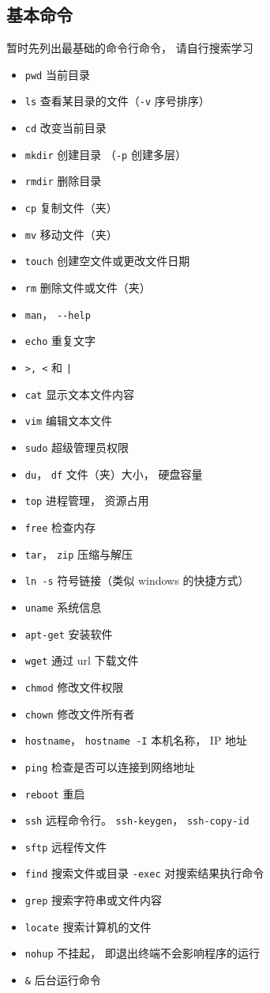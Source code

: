 \subsection{基本命令}
暂时先列出最基础的命令行命令， 请自行搜索学习
\begin{itemize}
\item \verb`pwd` 当前目录
\item \verb`ls` 查看某目录的文件（\verb`-v` 序号排序）
\item \verb`cd` 改变当前目录
\item \verb`mkdir` 创建目录 （\verb`-p` 创建多层）
\item \verb`rmdir` 删除目录
\item \verb`cp` 复制文件（夹）
\item \verb`mv` 移动文件（夹）
\item \verb`touch` 创建空文件或更改文件日期
\item \verb`rm` 删除文件或文件（夹）
\item \verb`man`， \verb`--help`
\item \verb`echo` 重复文字
\item \verb`>, <` 和 \verb`|`
\item \verb`cat` 显示文本文件内容
\item \verb`vim` 编辑文本文件
\item \verb`sudo` 超级管理员权限
\item \verb`du`， \verb`df` 文件（夹）大小， 硬盘容量
\item \verb`top` 进程管理， 资源占用
\item \verb`free` 检查内存
\item \verb`tar`， \verb`zip` 压缩与解压
\item \verb`ln -s` 符号链接（类似 windows 的快捷方式）
\item \verb`uname` 系统信息
\item \verb`apt-get` 安装软件
\item \verb`wget` 通过 url 下载文件
\item \verb`chmod` 修改文件权限
\item \verb`chown` 修改文件所有者
\item \verb`hostname`， \verb`hostname -I` 本机名称， IP 地址
\item \verb`ping` 检查是否可以连接到网络地址
\item \verb`reboot` 重启
\item \verb`ssh` 远程命令行。 \verb`ssh-keygen`， \verb`ssh-copy-id`
\item \verb`sftp` 远程传文件
\item \verb`find` 搜索文件或目录 \verb`-exec` 对搜索结果执行命令
\item \verb`grep` 搜索字符串或文件内容
\item \verb`locate` 搜索计算机的文件
\item \verb`nohup` 不挂起， 即退出终端不会影响程序的运行
\item \verb`&` 后台运行命令
\end{itemize}

